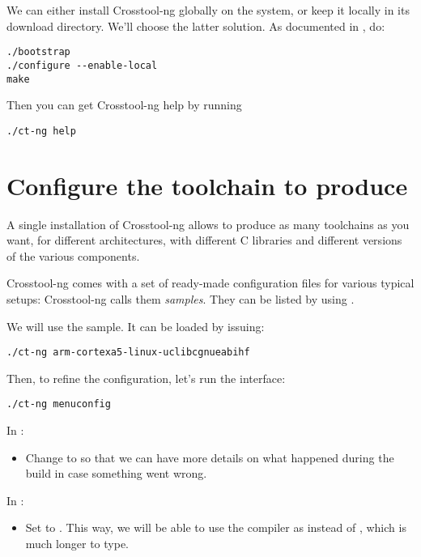 We can either install Crosstool-ng globally on the system, or keep it
locally in its download directory. We'll choose the latter
solution. As documented in
, do:

\begin{verbatim}
./bootstrap
./configure --enable-local
make
\end{verbatim}

Then you can get Crosstool-ng help by running

\begin{verbatim}
./ct-ng help
\end{verbatim}

\section{Configure the toolchain to produce}

A single installation of Crosstool-ng allows to produce as many
toolchains as you want, for different architectures, with different C
libraries and different versions of the various components.

Crosstool-ng comes with a set of ready-made configuration files for
various typical setups: Crosstool-ng calls them {\em samples}. They can be
listed by using .

We will use the  sample. It
can be loaded by issuing:

\begin{verbatim}
./ct-ng arm-cortexa5-linux-uclibcgnueabihf
\end{verbatim}

Then, to refine the configuration, let's run the  interface:

\begin{verbatim}
./ct-ng menuconfig
\end{verbatim}

In :
\begin{itemize}
\item Change  to  so that we can have more
  details on what happened during the build in case something went wrong.
\end{itemize}

In :
\begin{itemize}
\item Set  to . This way, we will
  be able to use the compiler as  instead of
  , which is much longer to
  type.
\end{itemize}

